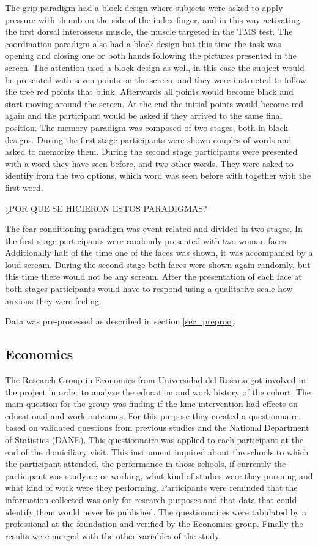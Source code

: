 The grip paradigm had a block design where subjects were asked to apply pressure with thumb on the side of the index finger, and in this way activating the first dorsal interosseus muscle, the muscle targeted in the TMS test. The coordination paradigm also had a block design but this time the task was opening and closing one or both hands following the pictures presented in the screen. The attention used a block design as well, in this case the subject would be presented with seven points on the screen, and they were instructed to follow the tree red points that blink. Afterwards all points would become black and start moving around the screen. At the end the initial points would become red again and the participant would be asked if they arrived to the same final position. 
The memory paradigm was composed of two stages, both in block designs. During the first stage participants were shown couples of words and asked to memorize them. During the second stage participants were presented with a word they have seen before, and two other words. They were asked to identify from the two options, which word was seen before with together with the first word.

¿POR QUE SE HICIERON ESTOS PARADIGMAS?

The fear conditioning paradigm \autocite{FRANCOISES} was event related and divided in two stages. In the first stage participants were randomly presented with two woman faces. Additionally half of the time one of the faces was shown, it was accompanied by a loud scream.  During the second stage  both faces were shown again randomly, but this time there would not be any scream. After the presentation of each face at both stages participants would have to respond using a qualitative scale how anxious they were feeling.
\smallskip

Data was pre-processed as described in section \ref{sec_preproc}.


\subsection{Economics}

The Research Group in Economics from Universidad del Rosario got involved in the project in order to analyze the education and work history of the cohort. The main question for the group was finding if the kmc intervention had effects on educational and work outcomes.  For this purpose they created a questionnaire, based on validated questions from previous studies and the National Department of Statistics (DANE). This questionnaire was applied to each participant at the end of the domiciliary visit. This instrument inquired about the schools to which the participant attended, the performance in those schools, if currently the participant was studying or working, what kind of studies were they pursuing and what kind of work were they performing. Participants were reminded that the information collected was only for research purposes and that data that could identify them would never be published. The questionnaires were tabulated by a professional at the foundation and verified by the Economics group. Finally the results were merged with the other variables of the study.

